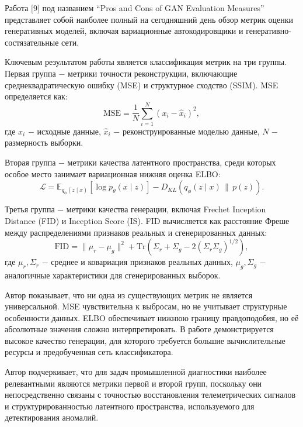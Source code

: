 \documentclass[14pt, a4paper, oneside]{extreport}
\begin{document}
Работа $[$9$]$ под названием “Pros and Cons of GAN Evaluation Measures” представляет собой наиболее полный на сегодняшний день обзор метрик оценки генеративных моделей, включая вариационные автокодировщики и генеративно-состязательные сети. 

Ключевым результатом работы является классификация метрик на три группы. Первая группа $-$ метрики точности реконструкции, включающие среднеквадратическую ошибку (MSE) и структурное сходство (SSIM). MSE определяется как:
\begin{equation}
\text{MSE} = \frac{1}{N} \sum_{i=1}^{N} (x_i - \hat{x}_i)^2,
\end{equation}
где $x_i$ $-$ исходные данные, $\hat{x}_i$ $-$ реконструированные моделью данные, $N$ $-$ размерность выборки.

Вторая группа $-$ метрики качества латентного пространства, среди которых особое место занимает вариационная нижняя оценка ELBO:
\begin{equation}
\mathcal{L} = \mathbb{E}_{q_\phi(z \mid x)}\left[\log p_\theta(x \mid z)\right] - D_{KL}\left(q_\phi(z \mid x) \,\|\, p(z)\right).
\end{equation}

Третья группа $-$ метрики качества генерации, включая Frechet Inception Distance (FID) и Inception Score (IS). FID вычисляется как расстояние Фреше между распределениями признаков реальных и сгенерированных данных:
\begin{equation}
\text{FID} = \|\mu_r - \mu_g\|^2 + \text{Tr}\left(\Sigma_r + \Sigma_g - 2(\Sigma_r \Sigma_g)^{1/2}\right),
\end{equation}
где $\mu_r, \Sigma_r$ $-$ среднее и ковариация признаков реальных данных, $\mu_g, \Sigma_g$ $-$ аналогичные характеристики для сгенерированных выборок.

Автор показывает, что ни одна из существующих метрик не является универсальной. MSE чувствительна к выбросам, но не учитывает структурные особенности данных. ELBO обеспечивает нижнюю границу правдоподобия, но её абсолютные значения сложно интерпретировать. В работе демонстрируется высокое качество генерации, для которого требуется большие вычислительные ресурсы и предобученная сеть классификатора.

Автор подчеркивает, что для задач промышленной диагностики наиболее релевантными являются метрики первой и второй групп, поскольку они непосредственно связаны с точностью восстановления телеметрических сигналов и структурированностью латентного пространства, используемого для детектирования аномалий.
\end{document}
